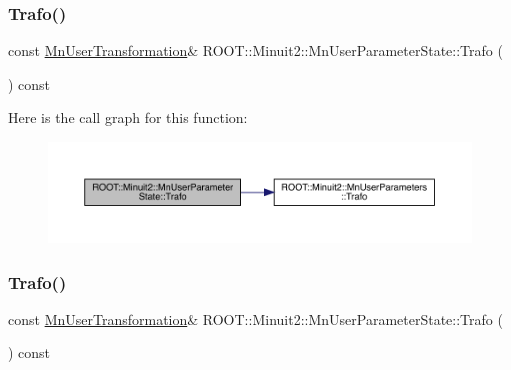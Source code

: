 \subsubsection{\texorpdfstring{Trafo()}{Trafo()}\hspace{0.1cm}{\footnotesize\ttfamily [2/3]}}
{\footnotesize\ttfamily const \mbox{\hyperlink{classROOT_1_1Minuit2_1_1MnUserTransformation}{Mn\+User\+Transformation}}\& R\+O\+O\+T\+::\+Minuit2\+::\+Mn\+User\+Parameter\+State\+::\+Trafo (\begin{DoxyParamCaption}{ }\end{DoxyParamCaption}) const\hspace{0.3cm}{\ttfamily [inline]}}

Here is the call graph for this function\+:
\nopagebreak
\begin{figure}[H]
\begin{center}
\leavevmode
\includegraphics[width=350pt]{d3/de0/classROOT_1_1Minuit2_1_1MnUserParameterState_a7184e94a20e923d68f1fb00ab5c549b2_cgraph}
\end{center}
\end{figure}
\mbox{\label{classROOT_1_1Minuit2_1_1MnUserParameterState_a7184e94a20e923d68f1fb00ab5c549b2}} 
\subsubsection{\texorpdfstring{Trafo()}{Trafo()}\hspace{0.1cm}{\footnotesize\ttfamily [3/3]}}
{\footnotesize\ttfamily const \mbox{\hyperlink{classROOT_1_1Minuit2_1_1MnUserTransformation}{Mn\+User\+Transformation}}\& R\+O\+O\+T\+::\+Minuit2\+::\+Mn\+User\+Parameter\+State\+::\+Trafo (\begin{DoxyParamCaption}{ }\end{DoxyParamCaption}) const\hspace{0.3cm}{\ttfamily [inline]}}

